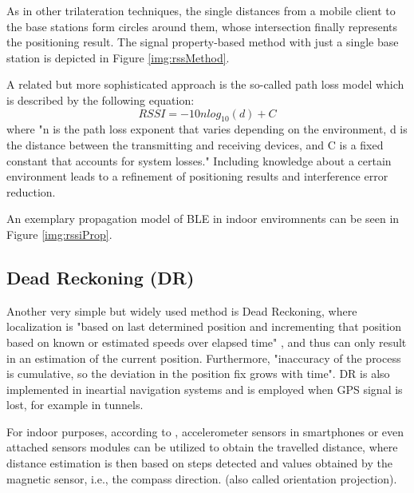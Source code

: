 As in other trilateration techniques, the single distances from a mobile client to the base stations form circles around them, whose intersection finally represents the positioning result.
The signal property-based method with just a single base station is depicted in Figure \ref{img:rssMethod}.


A related but more sophisticated approach is the so-called path loss model which is described by the following equation:
\[RSSI = -10nlog_{10}(d)+C\]
where "n is the path loss exponent that varies depending on the environment, d is the distance between the	transmitting and receiving devices, and C is a fixed constant that accounts for system losses." \cite{rssiIoT} Including knowledge about a certain environment leads to a refinement of positioning results and  interference error reduction.

An exemplary propagation model of BLE in indoor enviromnents can be seen in Figure \ref{img:rssiProp}.%
\subsection{Dead Reckoning (DR)}

Another very simple but widely used method is Dead Reckoning, where localization is "based on last determined	position and incrementing that position based on known or estimated speeds over elapsed time" \cite{recentAdvances}, and thus can only result in an estimation of the current position. Furthermore, "inaccuracy of the process is cumulative, so the deviation in the position
fix grows with time". \cite{recentAdvances} DR is also implemented in ineartial navigation systems and is employed when GPS signal is lost, for example in tunnels.

For indoor purposes, according to \cite{drSystem}, accelerometer sensors in smartphones or even attached sensors modules can be utilized to obtain the travelled distance, where distance estimation is then based on steps detected and values obtained by the magnetic sensor, i.e., the compass direction.  (also called orientation projection).

